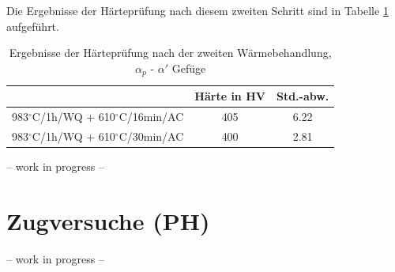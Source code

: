 Die Ergebnisse der Härteprüfung nach diesem zweiten Schritt sind in Tabelle \ref{Tabelle 9} aufgeführt.

\begin{table}[h]
	\centering
	\begin{tabular}{|c|c|c|}
		\hline 
		& Härte in HV &  Std.-abw. \\ 
		\hline 
		983$^\circ$C/1h/WQ + 610$^\circ$C/16min/AC & 405 & 6.22 \\ 
		\hline 
		983$^\circ$C/1h/WQ + 610$^\circ$C/30min/AC & 400 & 2.81 \\ 
		\hline 
	\end{tabular} 
	\caption{Ergebnisse der Härteprüfung nach der zweiten Wärmebehandlung, $\alpha_p$ - $\alpha'$ Gefüge}
	\label{Tabelle 9}
\end{table}

-- work in progress --

\section{Zugversuche (PH)}

-- work in progress --